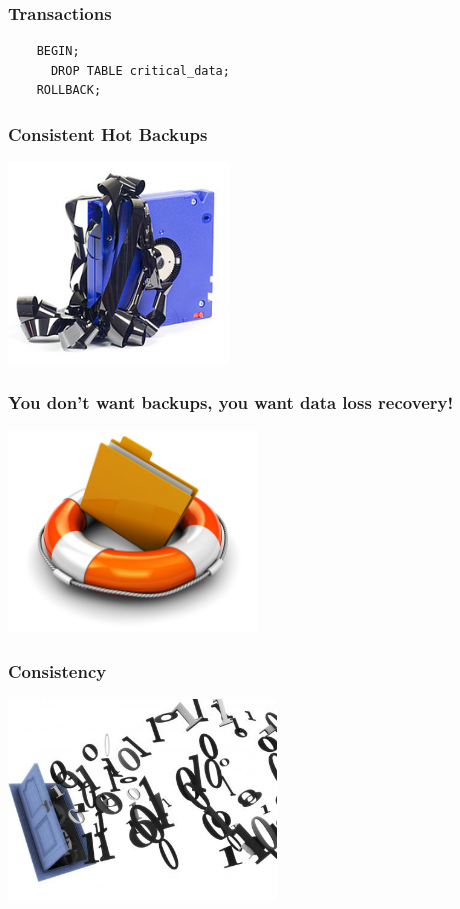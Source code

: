 \documentclass{beamer}
\begin{document}
\begin{frame}[fragile]
  \frametitle{Transactions}

  \begin{verbatim}
    BEGIN;
      DROP TABLE critical_data;
    ROLLBACK;
  \end{verbatim}
\end{frame}

\begin{frame}
  \frametitle{Consistent Hot Backups}


  \begin{center}
    \includegraphics[height=2.1in]{online-backup.jpg}
  \end{center}
\end{frame}

\begin{frame}
  \frametitle{You don't want backups, you want data loss recovery!}

  \begin{center}
    \includegraphics[height=2.1in]{Data-Recovery-Service-Icon.jpg}
  \end{center}
\end{frame}

\begin{frame}
  \frametitle{Consistency}


  \begin{center}
    \includegraphics[height=2.1in]{bits.jpeg}
  \end{center}
\end{frame}
\end{document}
